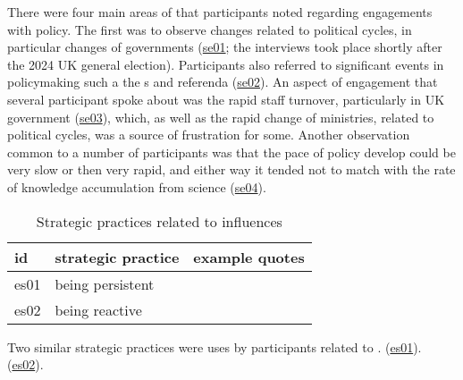 There were four main areas of \skieven{} that participants noted regarding engagements with policy. The first was to observe changes related to political cycles, in particular changes of governments (\hyperref[tab:resskieven]{se01}; the interviews took place shortly after the 2024 UK general election). Participants also referred to significant events in policymaking such a the \COP s and referenda (\hyperref[tab:resskieven]{se02}). An aspect of engagement that several participant spoke about was the rapid staff turnover, particularly in UK government (\hyperref[tab:resskieven]{se03}), which, as well as the rapid change of ministries, related to political cycles, was a source of frustration for some. Another observation common to a number of participants was that the pace of policy develop could be very slow or then very rapid, and either way it tended not to match with the rate of knowledge accumulation from science (\hyperref[tab:resskieven]{se04}). 

\begin{table}[!ht]
\footnotesize
\caption{Strategic practices related to \skieven{} influences}\label{tab:resskievenstrat}
\begin{tabular}{L{.06\linewidth}L{.3\linewidth}L{.64\linewidth}} \hline
\textbf{id} & \textbf{strategic practice} & \textbf{example quotes} \\ \hline \hline
es01 & being persistent &  \\[5mm]
es02 & being reactive &  \\[5mm]
\hline
 \end{tabular}
\end{table}

Two similar strategic practices were uses by participants related to \skieven.  (\hyperref[tab:resskievenstrat]{es01}).  (\hyperref[tab:resskievenstrat]{es02}).

